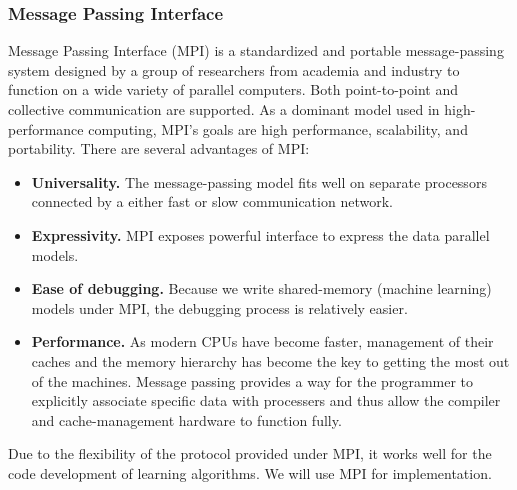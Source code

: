 \hspace{0.02in}
\subsubsection{Message Passing Interface}
Message Passing Interface (MPI) is a standardized and portable message-passing system designed by a group of researchers from academia and industry to function on a wide variety of parallel computers. Both point-to-point and collective communication are supported. As a dominant model used in high-performance computing, MPI's goals are high performance, scalability, and portability. There are several advantages of MPI:
\begin{itemize}
\item {\bf Universality.} The message-passing model fits well on separate processors connected by a either fast or slow communication network.
\item {\bf Expressivity.} MPI exposes powerful interface to express the data parallel models.
\item {\bf Ease of debugging.} Because we write shared-memory (machine learning) models under MPI, the debugging process is relatively easier.
\item {\bf Performance.} As modern CPUs have become faster, management of their caches and the memory hierarchy has become the key to getting the most out of the machines. Message passing provides a way for the programmer to explicitly associate specific data with processers and thus allow the compiler and cache-management hardware to function fully.
\end{itemize}
Due to the flexibility of the protocol provided under MPI, it works well for the code development of learning algorithms. We will use MPI for implementation.



